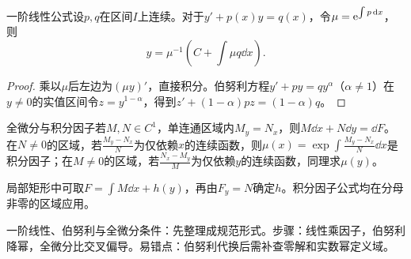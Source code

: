 \begin{theorem}{一阶线性公式}设$p,q$在区间$I$上连续。对于$y\prime+p(x)y=q(x)$，令$\mu=\mathrm{e}^{\int p\mathop{}\!\mathrm{d} x}$，则
\begin{equation}y=\mu^{-1}\left(C+\int\mu q\dd x\right).\end{equation}
\end{theorem}
\begin{proof}乘以$\mu$后左边为$(\mu y)\prime$，直接积分。伯努利方程$y\prime+py=qy^\alpha$（$\alpha\ne1$）在$y\ne0$的实值区间令$z=y^{1-\alpha}$，得到$z\prime+(1-\alpha)pz=(1-\alpha)q$。\end{proof}
\begin{theorem}{全微分与积分因子}若$M,N\in C^1$，单连通区域内$M_y=N_x$，则$M\dd x+N\dd y=\dd F$。在$N\ne0$的区域，若$\frac{M_y-N_x}{N}$为仅依赖$x$的连续函数，则$\mu(x)=\exp\int\frac{M_y-N_x}{N}\dd x$是积分因子；在$M\ne0$的区域，若$\frac{N_x-M_y}{M}$为仅依赖$y$的连续函数，同理求$\mu(y)$。\end{theorem}
局部矩形中可取$F=\int M\dd x+h(y)$，再由$F_y=N$确定$h$。积分因子公式均在分母非零的区域应用。

\begin{method}{一阶线性、伯努利与全微分}条件：先整理成规范形式。步骤：线性乘因子，伯努利降幂，全微分比交叉偏导。易错点：伯努利代换后需补查零解和实数幂定义域。\end{method}
